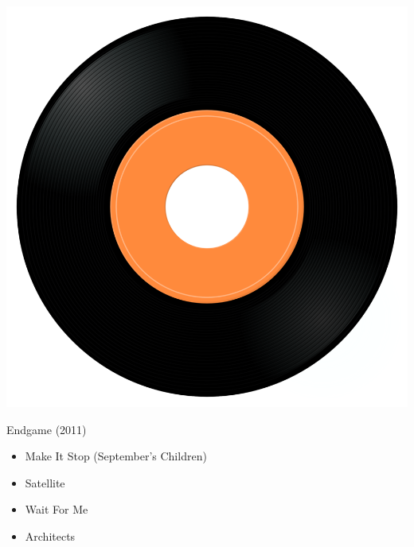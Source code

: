 \begin{minipage}[t]{0.25\textwidth}
\captionsetup{type=figure}
\includegraphics[width=\textwidth]{Images/cover.png}
\caption*{Endgame (2011)}
\end{minipage}
\begin{minipage}[t]{0.25\textwidth}\vspace{0pt}
\begin{itemize}[nosep,leftmargin=1em,labelwidth=*,align=left]
	\setlength{\itemsep}{0pt}
	\item Make It Stop (September’s Children)
	\item Satellite
	\item Wait For Me
	\item Architects
\end{itemize}
\end{minipage}
